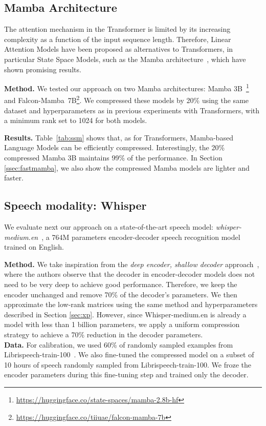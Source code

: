 \documentclass[11pt]{article}
\newcommand{\myparagraph}[1]{\noindent\textbf{#1}}
\begin{document}
\subsection{Mamba Architecture}

The attention mechanism in the Transformer is limited by its increasing complexity as a function of the input sequence length.
Therefore, Linear Attention Models have been proposed as alternatives to Transformers, in particular State Space Models, such as the Mamba architecture~\citep{gu2024mambalineartimesequencemodeling}, which have shown promising results.

\myparagraph{Method.} We tested our approach on two Mamba architectures: Mamba
3B~\citep{gu2024mambalineartimesequencemodeling}\footnote{\url{https://huggingface.co/state-spaces/mamba-2.8b-hf}} and Falcon-Mamba~7B\footnote{\scriptsize{\url{https://huggingface.co/tiiuae/falcon-mamba-7b}}}.
We compressed these models by 20\% using the same dataset and hyperparameters as in previous experiments with Transformers, with a minimum rank set to 1024 for both models.

\myparagraph{Results.} Table~\ref{tab:ssm} shows that, as for Transformers, Mamba-based Language Models can be efficiently compressed. Interestingly, the 20\% compressed Mamba 3B maintains 99\% of the performance. In Section \ref{ssec:fastmamba}, we also show the compressed Mamba models are lighter and faster.

\subsection{Speech modality: Whisper}

We evaluate next our approach on a state-of-the-art speech model: {\it whisper-medium.en}~\citep{radford2022robustspeechrecognitionlargescale}, a 764M parameters encoder-decoder speech recognition model trained on English.

\myparagraph{Method.} We take inspiration from the \textit{deep encoder,
shallow decoder} approach~\citep{kasai2021deepencodershallowdecoder}, where the
authors observe that the decoder in encoder-decoder models does not need to be very deep to achieve good performance. 
Therefore, we keep the encoder unchanged and remove 70\% of the decoder's parameters. We then approximate the low-rank matrices using the same method and hyperparameters described in Section \ref{sec:xp}. However, since Whisper-medium.en is already a model with less than 1 billion parameters, we apply a uniform compression strategy to achieve a 70\% reduction in the decoder parameters. \\
\myparagraph{Data.} For calibration, we used 60\% of randomly sampled examples from Librispeech-train-100~\citep{librispeech}. We also fine-tuned the compressed model on a subset of 10 hours of speech randomly sampled from Librispeech-train-100. We froze the encoder parameters during this fine-tuning step and trained only the decoder.
\end{document}
